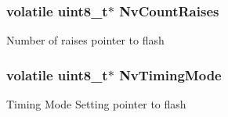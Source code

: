 \subsubsection[{Nv\+Count\+Raises}]{\setlength{\rightskip}{0pt plus 5cm}volatile uint8\+\_\+t$\ast$ Nv\+Count\+Raises}\label{group__main__module_ga515a64111062904ebde3d38b51d1d7d2}
Number of raises pointer to flash \hypertarget{group__main__module_ga56dcc37aec297d091908aa8c6c90a89e}{}
\subsubsection[{Nv\+Timing\+Mode}]{\setlength{\rightskip}{0pt plus 5cm}volatile uint8\+\_\+t$\ast$ Nv\+Timing\+Mode}\label{group__main__module_ga56dcc37aec297d091908aa8c6c90a89e}
Timing Mode Setting pointer to flash 